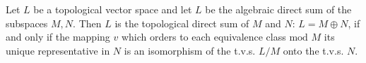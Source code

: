 Let $L$ be a topological vector space and let $L$ be the algebraic direct sum of the subspaces $M, N$. Then $L$ is the topological direct sum of $M$ and $N$: $L = M \oplus N$, if and only if the mapping $v$ which orders to each equivalence class $\text{mod } M$ its unique representative in $N$ is an isomorphism of the t.v.s. $L/M$ onto the t.v.s. $N$.
